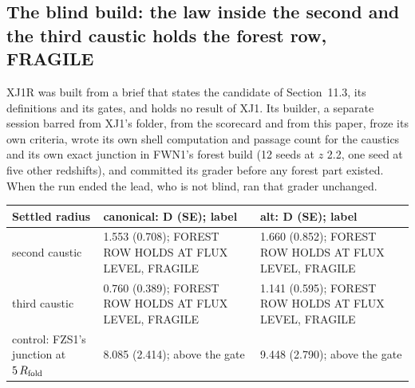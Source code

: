 \documentclass[10pt]{article}
\begin{document}
\subsection{The blind build: the law inside the second and the third caustic holds the forest row, FRAGILE}
XJ1R was built from a brief that states the candidate of Section~11.3, its definitions and its gates, and holds no result of XJ1. Its builder, a separate session barred from XJ1's folder, from the scorecard and from this paper, froze its own criteria, wrote its own shell computation and passage count for the caustics and its own exact junction in FWN1's forest build (12 seeds at $z$ 2.2, one seed at five other redshifts), and committed its grader before any forest part existed. When the run ended the lead, who is not blind, ran that grader unchanged.
{\small
\begin{longtable}{@{}p{3.4cm}p{6.0cm}p{6.0cm}@{}}\toprule
Settled radius & canonical: D (SE); label & alt: D (SE); label\\\midrule\endhead
second caustic & 1.553 (0.708); FOREST ROW HOLDS AT FLUX LEVEL, FRAGILE & 1.660 (0.852); FOREST ROW HOLDS AT FLUX LEVEL, FRAGILE\\
third caustic & 0.760 (0.389); FOREST ROW HOLDS AT FLUX LEVEL, FRAGILE & 1.141 (0.595); FOREST ROW HOLDS AT FLUX LEVEL, FRAGILE\\
control: FZS1's junction at $5\,R_{\rm fold}$ & 8.085 (2.414); above the gate & 9.448 (2.790); above the gate\\\bottomrule
\end{longtable}}
\end{document}
